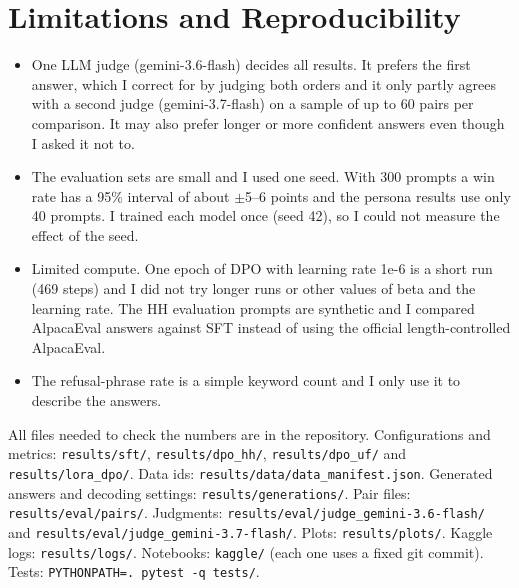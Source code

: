 \documentclass[11pt,a4paper]{article}
\begin{document}
\section{Limitations and Reproducibility}

\begin{itemize}
\item One LLM judge (gemini-3.6-flash) decides all results. It prefers the first answer, which I correct for by judging both orders and it
only partly agrees with a second judge (gemini-3.7-flash) on a sample of up to 60 pairs per comparison. It may also prefer longer or more confident
answers even though I asked it not to.
\item The evaluation sets are small and I used one seed. With 300 prompts a win rate has a 95\% interval of about $\pm$5--6 points and the
persona results use only 40 prompts. I trained each model once (seed 42), so I could not measure the effect of the seed.
\item Limited compute. One epoch of DPO with learning rate 1e-6 is a short run (469 steps) and I did not try longer runs or other values of
beta and the learning rate. The HH evaluation prompts are synthetic and I compared AlpacaEval answers against SFT instead of using the official
length-controlled AlpacaEval.
\item The refusal-phrase rate is a simple keyword count and I only use it to describe the answers.
\end{itemize}

All files needed to check the numbers are in the repository. Configurations and metrics: \texttt{results/sft/}, \texttt{results/dpo\_hh/},
\texttt{results/dpo\_uf/} and \texttt{results/lora\_dpo/}. Data ids: \texttt{results/data/data\_manifest.json}. Generated answers and decoding
settings: \texttt{results/generations/}. Pair files: \texttt{results/eval/pairs/}. Judgments: \texttt{results/eval/judge\_gemini-3.6-flash/}
and \texttt{results/eval/judge\_gemini-3.7-flash/}. Plots: \texttt{results/plots/}. Kaggle logs: \texttt{results/logs/}. Notebooks:
\texttt{kaggle/} (each one uses a fixed git commit). Tests: \texttt{PYTHONPATH=. pytest -q tests/}.
\end{document}
